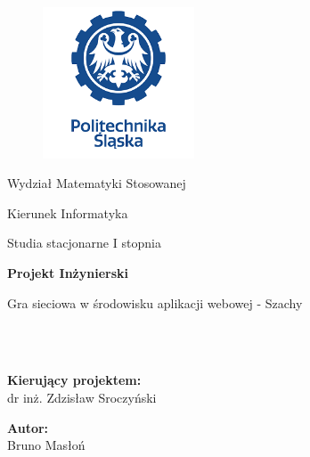 \documentclass[12pt,a4paper]{article}
\begin{document}
\clearpage

\begin{figure}[h]
\centering
\includegraphics[width=0.4\textwidth]{images/ps-logo.png}
\end{figure}

\begin{center}
\large{Wydział Matematyki Stosowanej}
\end{center}
\begin{center}
\large{Kierunek Informatyka}
\end{center}
\begin{center}
\large{Studia stacjonarne I stopnia}
\end{center}

\hspace{6cm}

\begin{center}
\Huge\textbf{Projekt Inżynierski}
\end{center}
\begin{center}
\Large{Gra sieciowa w środowisku aplikacji webowej - Szachy}
\end{center}

\hspace{6cm}
\\\\

\begin{minipage}[t]{0.3\textwidth}
    \begin{center}
    \normalsize{\textbf{Kierujący projektem:}\\dr inż. Zdzisław Sroczyński}
    \end{center}
\end{minipage}
\hfill
\begin{minipage}[t]{0.3\textwidth}
    \begin{center}
    \normalsize{\textbf{Autor:}\\Bruno Masłoń}
    \end{center}
\end{minipage}
\end{document}
